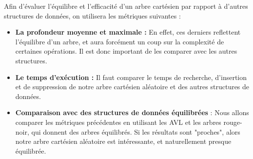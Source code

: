 \documentclass[a4paper,12pt]{report}
\begin{document}
\vspace{0.5cm}


\begin{tcolorbox}[colback=gray!10, colframe=blue!30, coltitle=black, title=Les métriques pertinentes]

    Afin d'évaluer l'équilibre et l'efficacité d'un arbre cartésien par rapport à d'autres structures de données, on utilisera les métriques suivantes :

    \begin{itemize}
        \item \textbf{La profondeur moyenne et maximale :} En effet, ces derniers reflettent l'équilibre d'un arbre, et aura forcément un coup sur la complexité de certaines
            opérations. Il est donc important de les comparer avec les autres structures.
        \item \textbf{Le temps d'exécution :} Il faut comparer le temps de recherche, d'insertion et de suppression de notre arbre cartésien aléatoire et des autres
            structures de données.
        \item \textbf{Comparaison avec des structures de données équilibrées} : Nous allons comparer les métriques précédentes en utilisant les AVL et les arbres 
            rouge-noir, qui donnent des arbres équilibrés. Si les résultats sont "proches", alors notre arbre cartésien aléatoire est intéressante, et naturellement
            presque équilibrée.
    \end{itemize}

\end{tcolorbox}

\newpage

\end{document}
